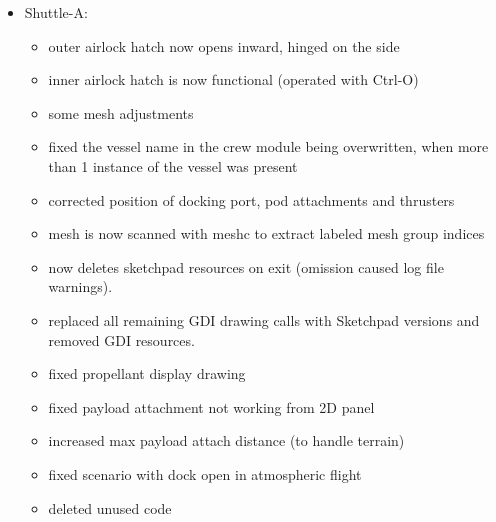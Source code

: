 \documentclass[Orbiter User Manual.tex]{subfiles}
\begin{document}
\begin{itemize}
\begin{itemize}
		\item creating a new DeltaGlider or DG-S instance in a simulation that already contained a DeltaGlider(non-scram) instance would corrupt the fuel display, and prevent the scram throttle levers from showing. This was caused by mesh edits that were not cleared before the new instance was initialised, leading to cumulative mesh modifications. [issue \#1323]
		\item fuel level indicators and fuel readouts corrupted in 2D panel mode when switching between vessel instances[issue \#1323]
		\item airbrake status indicator blinking together with retro door indicator when airbrake set at 1/2 position[issue \#1322]
		\item Fix for wrong visors being hidden when hiding a passenger.
		\item Corrected position of RCS exhausts to match the mesh.
		\item Fixed flickering "doors" in planetarium mode.
	\end{itemize}
	\item Shuttle-A:
	\begin{itemize}
		\item outer airlock hatch now opens inward, hinged on the side
		\item inner airlock hatch is now functional (operated with Ctrl-O)
		\item some mesh adjustments
		\item fixed the vessel name in the crew module being overwritten, when more than 1 instance of the vessel was present
		\item corrected position of docking port, pod attachments and thrusters
		\item mesh is now scanned with meshc to extract labeled mesh group indices
		\item now deletes sketchpad resources on exit (omission caused log file warnings).
		\item replaced all remaining GDI drawing calls with Sketchpad versions and removed GDI resources.
		\item fixed propellant display drawing
		\item fixed payload attachment not working from 2D panel
		\item increased max payload attach distance (to handle terrain)
		\item fixed scenario with dock open in atmospheric flight
		\item deleted unused code

\end{itemize}
\end{itemize}
\end{document}
